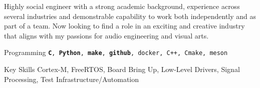 
    Highly social engineer with a strong academic background, experience across several industries and demonstrable capability to work both independently and as part of a team.
    Now looking to find a role in an exciting and creative industry that aligns with my passions for audio engineering and visual arts.

\begin{cvskills}

  \cvskill
    {Programming} %
    {\texttt{\textbf{C}, \textbf{Python}, \textbf{make}, \textbf{github}, docker, C++, Cmake, meson}} %

  \cvskill
    {Key Skills} %
    {Cortex-M, FreeRTOS, Board Bring Up, Low-Level Drivers, Signal Processing, Test Infrastructure/Automation} %

\end{cvskills}
